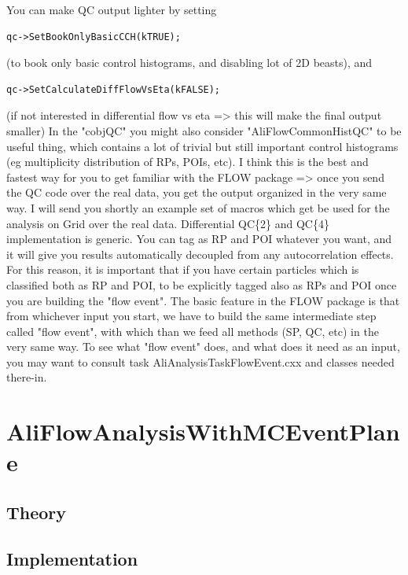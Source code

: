 \documentclass[a4paper]{book}
\numberwithin{equation}{subsection}
\begin{document}
 You can make QC output lighter by setting 
 	\begin{lstlisting}
qc->SetBookOnlyBasicCCH(kTRUE);	\end{lstlisting} 
(to book only basic control histograms, and disabling lot of 2D beasts), and 
	\begin{lstlisting}
qc->SetCalculateDiffFlowVsEta(kFALSE); 	\end{lstlisting}
(if not interested in differential flow vs eta => this will make the final output smaller) 
 In the "cobjQC" you might also consider "AliFlowCommonHistQC" to be useful thing, which contains a lot of trivial but still important control histograms (eg multiplicity distribution of RPs, POIs, etc). 
 I think this is the best and fastest way for you to get familiar with the FLOW package => once you send the QC code over the real data, you get the output organized in the very same way. I will send you shortly an example set of macros which get be used for the analysis on Grid over the real data. 
 Differential QC\{2\} and QC\{4\} implementation is generic. You can tag as RP and POI whatever you want, and it will give you results automatically decoupled from any autocorrelation effects. For this reason, it is important that if you have certain particles which is classified both as RP and POI, to be explicitly tagged also as RPs and POI once you are building the "flow event". 
 The basic feature in the FLOW package is that from whichever input you start, we have to build the same intermediate step called "flow event", with which than we feed all methods (SP, QC, etc) in the very same way. 
 To see what "flow event" does, and what does it need as an input, you may want to consult task AliAnalysisTaskFlowEvent.cxx and classes needed there-in. 



\section{AliFlowAnalysisWithMCEventPlane}
\subsection{Theory}
\subsection{Implementation}
\begin{lstlisting}

\end{lstlisting}
\end{document}
